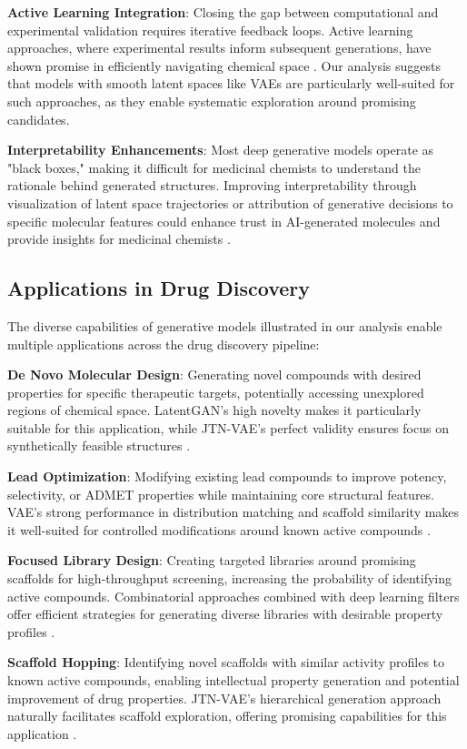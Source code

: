 \documentclass[conference]{IEEEtran}
\begin{document}
\textbf{Active Learning Integration}: Closing the gap between computational and experimental validation requires iterative feedback loops. Active learning approaches, where experimental results inform subsequent generations, have shown promise in efficiently navigating chemical space \cite{Panteleev2018}. Our analysis suggests that models with smooth latent spaces like VAEs are particularly well-suited for such approaches, as they enable systematic exploration around promising candidates.

\textbf{Interpretability Enhancements}: Most deep generative models operate as "black boxes," making it difficult for medicinal chemists to understand the rationale behind generated structures. Improving interpretability through visualization of latent space trajectories or attribution of generative decisions to specific molecular features could enhance trust in AI-generated molecules and provide insights for medicinal chemists \cite{Winter2019}.

\subsection{Applications in Drug Discovery}
The diverse capabilities of generative models illustrated in our analysis enable multiple applications across the drug discovery pipeline:

\textbf{De Novo Molecular Design}: Generating novel compounds with desired properties for specific therapeutic targets, potentially accessing unexplored regions of chemical space. LatentGAN's high novelty makes it particularly suitable for this application, while JTN-VAE's perfect validity ensures focus on synthetically feasible structures \cite{Moret2020}.

\textbf{Lead Optimization}: Modifying existing lead compounds to improve potency, selectivity, or ADMET properties while maintaining core structural features. VAE's strong performance in distribution matching and scaffold similarity makes it well-suited for controlled modifications around known active compounds \cite{Atance2022}.

\textbf{Focused Library Design}: Creating targeted libraries around promising scaffolds for high-throughput screening, increasing the probability of identifying active compounds. Combinatorial approaches combined with deep learning filters offer efficient strategies for generating diverse libraries with desirable property profiles \cite{Jimenez-Luna2020}.

\textbf{Scaffold Hopping}: Identifying novel scaffolds with similar activity profiles to known active compounds, enabling intellectual property generation and potential improvement of drug properties. JTN-VAE's hierarchical generation approach naturally facilitates scaffold exploration, offering promising capabilities for this application \cite{Jin2018}.
\end{document}
